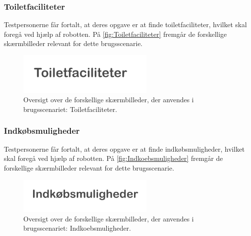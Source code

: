 \subsubsection*{Toiletfaciliteter}
%
Testpersonerne får fortalt, at deres opgave er at finde toiletfaciliteter, hvilket skal foregå ved hjælp af robotten. På \autoref{fig:Toiletfaciliteter} fremgår de forskellige skærmbilleder relevant for dette brugsscenarie. 
%
\begin{figure}[H]
\centering
\includegraphics[width = 0.6\textwidth]{Figure/Toiletfaciliteter} 
\caption{Oversigt over de forskellige skærmbilleder, der anvendes i brugsscenariet: Toiletfaciliteter.}
\label{fig:Toiletfaciliteter}
\end{figure}
\noindent
%  
\subsubsection*{Indkøbsmuligheder}
Testpersonerne får fortalt, at deres opgave er at finde indkøbsmuligheder, hvilket skal foregå ved hjælp af robotten. På \autoref{fig:Indkoebsmuligheder} fremgår de forskellige skærmbilleder relevant for dette brugsscenarie. 
%
\begin{figure}[H]
\centering
\includegraphics[width = 0.6\textwidth]{Figure/Indkoebsmuligheder} 
\caption{Oversigt over de forskellige skærmbilleder, der anvendes i brugsscenariet: Indkoebsmuligheder.}
\label{fig:Indkoebsmuligheder}
\end{figure}
\noindent
% 
